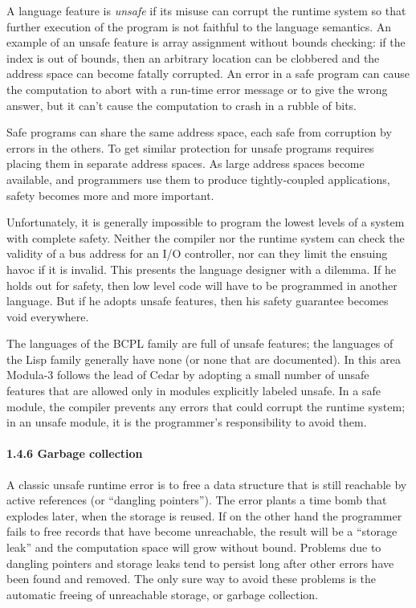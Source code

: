 \documentclass[10pt]{article}
\begin{document}
A language feature is \emph{unsafe} if its misuse can corrupt the runtime
system so that further execution of the program is not faithful to the
language semantics.  An example of an unsafe feature is array assignment
without bounds checking: if the index is out of bounds, then an arbitrary
location can be clobbered and the address space can become fatally
corrupted.  An error in a safe program can cause the computation to abort with
a run-time error message or to give the wrong answer, but it can't cause the
computation to crash in a rubble of bits.

Safe programs can share the same address space, each safe from corruption by
errors in the others.  To get similar protection for unsafe programs requires
placing them in separate address spaces.  As large address spaces become
available, and programmers use them to produce tightly-coupled applications,
safety becomes more and more important.

Unfortunately, it is generally impossible to program the lowest levels of a
system with complete safety.  Neither the compiler nor the runtime system can
check the validity of a bus address for an I/O controller, nor can they limit
the ensuing havoc if it is invalid.  This presents the language designer with a
dilemma.  If he holds out for safety, then low level code will have to be
programmed in another language.  But if he adopts unsafe features, then his
safety guarantee becomes void everywhere.

The languages of the BCPL family are full of unsafe features; the languages of
the Lisp family generally have none (or none that are documented).  In this
area Modula-3 follows the lead of Cedar by adopting a small number of unsafe
features that are allowed only in modules explicitly labeled unsafe.  In a safe
module, the compiler prevents any errors that could corrupt the runtime
system; in an unsafe module, it is the programmer's responsibility to avoid
them.

\paragraph{1.4.6 Garbage collection}

A classic unsafe runtime error is to free a data structure that is still
reachable by active references (or ``dangling pointers'').  The error plants a
time bomb that explodes later, when the storage is reused.  If on the other
hand the programmer fails to free records that have become unreachable, the
result will be a ``storage leak'' and the computation space will grow without
bound.  Problems due to dangling pointers and storage leaks tend to persist
long after other errors have been found and removed.  The only sure way to
avoid these problems is the automatic freeing of unreachable storage, or
garbage collection.
\end{document}
